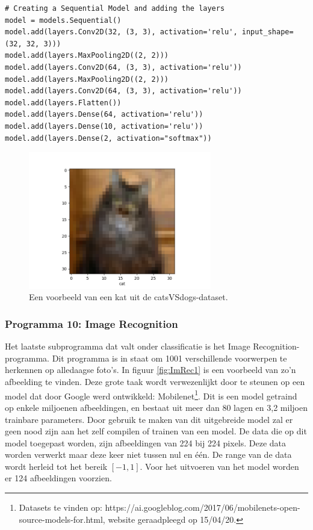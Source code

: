 		
\begin{lstlisting}[caption={Structuur van het \gls{cnn} catsVSdogs.}, captionpos=b,label={lst:catsVSdogsmodel}]
# Creating a Sequential Model and adding the layers
model = models.Sequential()
model.add(layers.Conv2D(32, (3, 3), activation='relu', input_shape=(32, 32, 3)))
model.add(layers.MaxPooling2D((2, 2)))
model.add(layers.Conv2D(64, (3, 3), activation='relu'))
model.add(layers.MaxPooling2D((2, 2)))
model.add(layers.Conv2D(64, (3, 3), activation='relu'))
model.add(layers.Flatten())
model.add(layers.Dense(64, activation='relu'))
model.add(layers.Dense(10, activation='relu'))
model.add(layers.Dense(2, activation="softmax"))
\end{lstlisting}	



		\begin{figure}
			\centering
			\includegraphics[width=80mm]{afbeeldingen/catsVSdogs1.PNG}
			\caption{Een voorbeeld van een kat uit de catsVSdogs-dataset.}
			\label{fig:catsVSdogs1}
		\end{figure}
		
		\newpage
		
		\subsubsection{Programma 10: Image Recognition}
			Het laatste subprogramma dat valt onder classificatie is het Image Recognition-programma. Dit programma is in staat om 1001 verschillende voorwerpen te herkennen op alledaagse foto's. In figuur \ref{fig:ImRec1} is een voorbeeld van zo'n afbeelding te vinden. Deze grote taak wordt verwezenlijkt door te steunen op een model dat door Google werd ontwikkeld: Mobilenet\footnote{Datasets te vinden op: https://ai.googleblog.com/2017/06/mobilenets-open-source-models-for.html, website geraadpleegd op 15/04/20.}. Dit is een model getraind op enkele miljoenen afbeeldingen, en bestaat uit meer dan 80 lagen en 3,2 miljoen trainbare parameters. 
			Door gebruik te maken van dit uitgebreide model zal er geen nood zijn aan het zelf compilen of trainen van een model. De data die op dit model toegepast worden, zijn afbeeldingen van 224 bij 224 pixels. Deze data worden verwerkt maar deze keer niet tussen nul en \'e\'en. De range van de data wordt herleid tot het bereik $[-1, 1]$. Voor het uitvoeren van het model worden er 124 afbeeldingen voorzien. 
		
